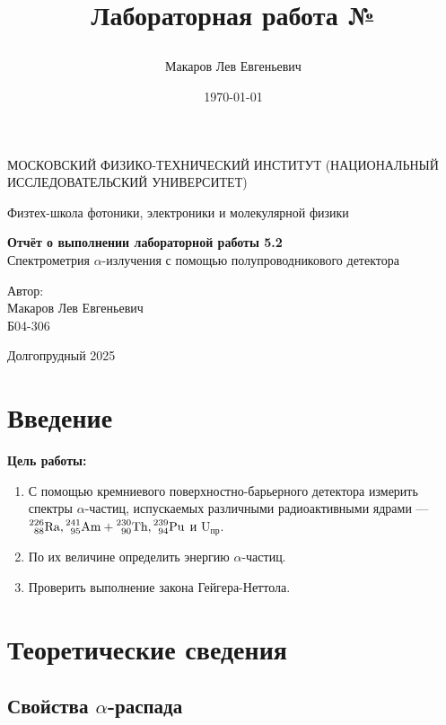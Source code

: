 \documentclass[a4paper,12pt]{article}
\author{Макаров Лев Евгеньевич}
\title{Лабораторная работа №\labnumber

\labname
}
\date{\today}
\newcommand\labname{Спектрометрия $\alpha$-излучения с помощью полупроводникового детектора}
\newcommand\labnumber{5.2}
\begin{document}
\begin{titlepage}
	\begin{center}
		{\large МОСКОВСКИЙ ФИЗИКО-ТЕХНИЧЕСКИЙ ИНСТИТУТ (НАЦИОНАЛЬНЫЙ ИССЛЕДОВАТЕЛЬСКИЙ УНИВЕРСИТЕТ)}
	\end{center}
	\begin{center}
		{\large Физтех-школа фотоники, электроники и молекулярной физики}
	\end{center}
	
	
	\vspace{4.5cm}
	{\huge
		\begin{center}
			{\bf Отчёт о выполнении лабораторной работы \labnumber}\\
			\labname
		\end{center}
	}
	\vspace{2cm}
	\begin{flushright}
		{\LARGE Автор:\\ Макаров Лев Евгеньевич \\
			\vspace{0.2cm}
			Б04-306}
	\end{flushright}
	\vspace{8cm}
	\begin{center}
		Долгопрудный 2025
	\end{center}
\end{titlepage}

\section{Введение}

\textbf{Цель работы:} 
\begin{enumerate}
	\item С помощью кремниевого поверхностно-барьерного детектора измерить спектры $\alpha$-частиц, испускаемых различными радиоактивными ядрами — $\prescript{226}{88}{\text{Ra}}, \prescript{241}{95}{\text{Am}} + \prescript{230}{90}{\text{Th}}, \prescript{239}{94}{\text{Pu}}$ и $\text{U}_\text{пр}$.
    \item По их величине определить энергию $\alpha$-частиц.
    \item Проверить выполнение закона Гейгера-Неттола.
\end{enumerate}


\section{Теоретические сведения}

\subsection*{Свойства $\alpha$-распада}
\end{document}
